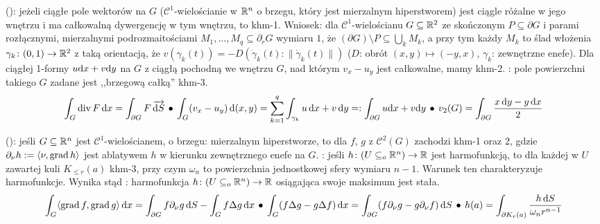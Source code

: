  ():  jeżeli ciągłe pole wektorów na $G$ ($\mathscr C^1$-wielościanie w $\mathbb{R}^n$ o brzegu, który jest mierzalnym hiperstworem) jest ciągle różalne w jego wnętrzu i ma całkowalną dywergencję w tym wnętrzu, to khm-1.
Wniosek: dla $\mathscr C^1$-wielościanu $G \subseteq \mathbb{R}^2$ ze skończonym $P \subseteq \partial G$ i parami rozłącznymi, mierzalnymi podrozmaitościami $M_1, \ldots, M_q \subseteq \partial_r G$ wymiaru $1$, że $(\partial G) \setminus P \subseteq \bigcup_k M_k$, a przy tym każdy $M_k$ to ślad włożenia $\gamma_k \colon (0,1) \to \mathbb{R}^2$ z taką orientacją, że $v(\gamma_k(t)) = -D(\dot \gamma_k(t) : \|\dot \gamma_k(t)\|)$ ($D$: obrót $(x, y) \mapsto (-y, x)$, $\gamma_k$: zewnętrzne enefe).
Dla ciągłej 1-formy $u \textrm{d} x + v \textrm{d} y$ na $G$ z ciągłą pochodną we wnętrzu $G$, nad którym $v_x - u_y$ jest całkowalne, mamy khm-2.
: pole powierzchni takiego $G$ zadane jest ,,brzegową całką'' khm-3.
\[
 	\int_G \operatorname{div} F \,\textrm{d} x = \int_{\partial G} F \,\overrightarrow{\textrm{d} S} \, \bullet \,
 	\int_G(v_x - u_y) \,\textrm{d} (x,y) = \sum_{k=1}^q \int_{\gamma_k} u \,\textrm{d} x + v \,\textrm{d} y =: \int_{\partial G} u \textrm{d} x + v \textrm{d} y \, \bullet \,
 	v_2(G) = \int_{\partial G} \frac{x \, \textrm{d} y -y \,\textrm{d} x}{2}
\]

 ():  jeśli $G \subseteq \mathbb{R}^n$ jest $\mathscr C^1$-wielościanem, o brzegu: mierzalnym hiperstworze, to dla $f$, $g$ z $\mathscr C^2(G)$ zachodzi khm-1 oraz 2, gdzie $\partial_\nu h := \langle \nu, \operatorname{grad} h\rangle$ jest ablatywem $h$ w kierunku zewnętrznego enefe na $G$.
: jeśli $h \colon (U \subseteq_o \mathbb{R}^n) \to \mathbb{R}$ jest harmofunkcją, to dla każdej w $U$ zawartej kuli $K_{\le r}(a)$ khm-3, przy czym $\omega_n$ to powierzchnia jednostkowej sfery wymiaru $n-1$.
Warunek ten charakteryzuje harmofunkcje.
Wynika stąd : harmofunkcja $h \colon (U \subseteq_o \mathbb{R}^n) \to \mathbb{R}$ osiągająca swoje maksimum jest stała.
\[
	\int_G \langle \operatorname{grad} f, \operatorname{grad} g \rangle \,\textrm{d} x = \int_{\partial G} f \partial_\nu g \,\textrm{d} S - \int_G f \Delta g \,\textrm{d} x \, \bullet \,
	\int_G (f \Delta g - g \Delta f) \,\textrm{d} x = \int_{\partial G} (f \partial_\nu g - g \partial_\nu f) \,\textrm{d} S \, \bullet \,
	h(a) = \int_{\partial K_r(a)}  \frac{h \,\textrm{d} S}{\omega_n r^{n-1}} 
\]